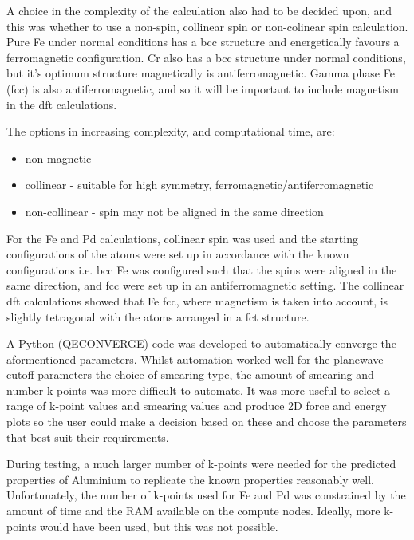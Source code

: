 A choice in the complexity of the calculation also had to be decided upon, and this was whether to use a non-spin, collinear spin or non-colinear spin calculation.  Pure Fe under normal conditions has a \acrshort{bcc} structure and energetically favours a ferromagnetic configuration.  Cr also has a \acrshort{bcc} structure under normal conditions, but it's optimum structure magnetically is antiferromagnetic.  Gamma phase Fe (\acrshort{fcc}) is also antiferromagnetic, and so it will be important to include magnetism in the \acrshort{dft} calculations.

The options in increasing complexity, and computational time, are:

\begin{itemize}
\item non-magnetic
\item collinear - suitable for high symmetry, ferromagnetic/antiferromagnetic
\item non-collinear - spin may not be aligned in the same direction
\end{itemize}

For the Fe and Pd calculations, collinear spin was used and the starting configurations of the atoms were set up in accordance with the known configurations i.e. \acrshort{bcc} Fe was configured such that the spins were aligned in the same direction, and \acrshort{fcc} were set up in an antiferromagnetic setting.  The collinear \acrshort{dft} calculations showed that Fe \acrshort{fcc}, where magnetism is taken into account, is slightly tetragonal with the atoms arranged in a \acrshort{fct} structure.

A Python (QECONVERGE) code was developed to automatically converge the aformentioned parameters.  Whilst automation worked well for the planewave cutoff parameters the choice of smearing type, the amount of smearing and number k-points was more difficult to automate.  It was more useful to select a range of k-point values and smearing values and produce 2D force and energy plots so the user could make a decision based on these and choose the parameters that best suit their requirements.

During testing, a much larger number of k-points were needed for the predicted properties of Aluminium to replicate the known properties reasonably well.  Unfortunately, the number of k-points used for Fe and Pd was constrained by the amount of time and the RAM available on the compute nodes.  Ideally, more k-points would have been used, but this was not possible.




